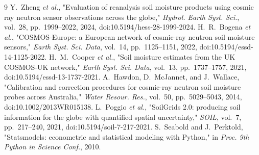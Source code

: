 \documentclass[11pt]{article}
\begin{document}
\begin{thebibliography}{9}
 Y.~Zheng \emph{et al.}, "Evaluation of
reanalysis soil moisture products using cosmic ray neutron sensor
observations across the globe," \emph{Hydrol. Earth Syst. Sci.},
vol.~28, pp.~1999–2022, 2024, doi:10.5194/hess-28-1999-2024.
 H.~R.~Bogena \emph{et al.},
"COSMOS-Europe: a European network of cosmic-ray neutron soil moisture
sensors," \emph{Earth Syst. Sci. Data}, vol.~14, pp.~1125–1151, 2022,
doi:10.5194/essd-14-1125-2022.
 H.~M.~Cooper \emph{et al.}, "Soil
moisture estimates from the UK COSMOS-UK network," \emph{Earth Syst.
Sci. Data}, vol.~13, pp.~1737–1757, 2021,
doi:10.5194/essd-13-1737-2021.
 A.~Hawdon, D.~McJannet, and J.~Wallace,
"Calibration and correction procedures for cosmic-ray neutron soil
moisture probes across Australia," \emph{Water Resour. Res.}, vol.~50,
pp.~5029–5043, 2014, doi:10.1002/2013WR015138.
 L.~Poggio \emph{et al.}, "SoilGrids 2.0:
producing soil information for the globe with quantified spatial
uncertainty," \emph{SOIL}, vol.~7, pp.~217–240, 2021,
doi:10.5194/soil-7-217-2021.
 S.~Seabold and J.~Perktold, "Statsmodels:
econometric and statistical modeling with Python," in \emph{Proc. 9th
Python in Science Conf.}, 2010.
\end{thebibliography}
\end{document}
